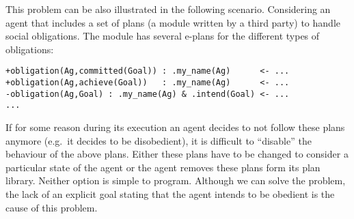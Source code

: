 This problem can be also illustrated in the following
scenario. Considering an agent that includes a set of plans (a module
written by a third party) to handle social obligations. The module has
several e-plans for the different types of obligations:
\begin{small}
\begin{verbatim}
+obligation(Ag,committed(Goal)) : .my_name(Ag)      <- ...
+obligation(Ag,achieve(Goal))   : .my_name(Ag)      <- ...
-obligation(Ag,Goal) : .my_name(Ag) & .intend(Goal) <- ...
...
\end{verbatim}
\end{small}
If for some reason during its execution an agent decides to not follow these plans anymore (e.g.\ it decides to be disobedient), it is difficult to ``disable'' the behaviour of the above plans. Either these plans have to be changed to consider a particular state of the agent or the agent removes these plans form its plan library. Neither option is simple to program. %
Although we can solve the problem, the lack of an explicit goal stating that the agent intends to be obedient is the cause of this problem.

%
%


